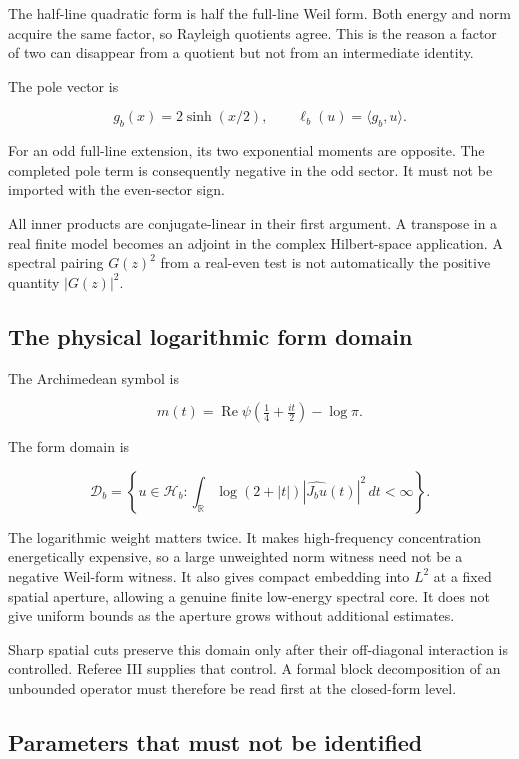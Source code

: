 \documentclass[
  10pt,
  a4paper,
  10pt,
  oneside,
  openany]{book}
\begin{document}
The half-line quadratic form is half the full-line Weil form. Both
energy and norm acquire the same factor, so Rayleigh quotients agree.
This is the reason a factor of two can disappear from a quotient but not
from an intermediate identity.

The pole vector is

\[
g_b(x)=2\sinh(x/2),
\qquad \ell_b(u)=\langle g_b,u\rangle.
\tag{2.8}\label{eq:2.8}
\]

For an odd full-line extension, its two exponential moments are
opposite. The completed pole term is consequently negative in the odd
sector. It must not be imported with the even-sector sign.

All inner products are conjugate-linear in their first argument. A
transpose in a real finite model becomes an adjoint in the complex
Hilbert-space application. A spectral pairing \(G(z)^2\) from a
real-even test is not automatically the positive quantity \(|G(z)|^2\).

\subsection{The physical logarithmic form
domain}\label{the-physical-logarithmic-form-domain}

The Archimedean symbol is

\[
m(t)=\operatorname{Re}\psi(\tfrac14+\tfrac{it}2)-\log\pi.
\tag{2.9}\label{eq:2.9}
\]

The form domain is

\[
\mathcal D_b=\left\{u\in\mathcal H_b:
\int_{\mathbb R}\log(2+|t|)|\widehat{J_bu}(t)|^2\,dt<\infty\right\}.
\tag{2.10}\label{eq:2.10}
\]

The logarithmic weight matters twice. It makes high-frequency
concentration energetically expensive, so a large unweighted norm
witness need not be a negative Weil-form witness. It also gives compact
embedding into \(L^2\) at a fixed spatial aperture, allowing a genuine
finite low-energy spectral core. It does not give uniform bounds as the
aperture grows without additional estimates.

Sharp spatial cuts preserve this domain only after their off-diagonal
interaction is controlled. Referee III supplies that control. A formal
block decomposition of an unbounded operator must therefore be read
first at the closed-form level.

\subsection{Parameters that must not be
identified}\label{parameters-that-must-not-be-identified}
\end{document}
